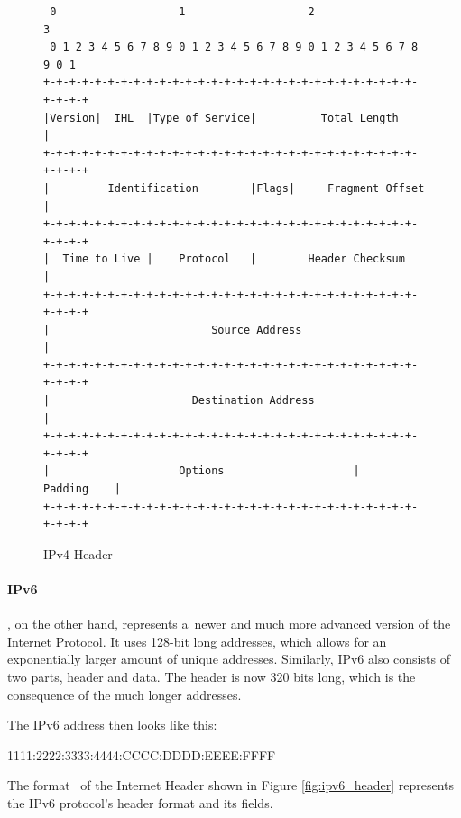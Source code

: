 \documentclass[
  printed,     %
  color,       %
  oneside,     %
  nosansbold,  %
  nocolorbold, %
  nolof,         %
  nolot,         %
]{fithesis4}
\begin{document}
\begin{figure}[h]
\fontsize{10pt}{10pt}\selectfont
\begin{center}
\begin{BVerbatim}
 0                   1                   2                   3  
 0 1 2 3 4 5 6 7 8 9 0 1 2 3 4 5 6 7 8 9 0 1 2 3 4 5 6 7 8 9 0 1
+-+-+-+-+-+-+-+-+-+-+-+-+-+-+-+-+-+-+-+-+-+-+-+-+-+-+-+-+-+-+-+-+
|Version|  IHL  |Type of Service|          Total Length         |
+-+-+-+-+-+-+-+-+-+-+-+-+-+-+-+-+-+-+-+-+-+-+-+-+-+-+-+-+-+-+-+-+
|         Identification        |Flags|     Fragment Offset     |
+-+-+-+-+-+-+-+-+-+-+-+-+-+-+-+-+-+-+-+-+-+-+-+-+-+-+-+-+-+-+-+-+
|  Time to Live |    Protocol   |        Header Checksum        |
+-+-+-+-+-+-+-+-+-+-+-+-+-+-+-+-+-+-+-+-+-+-+-+-+-+-+-+-+-+-+-+-+
|                         Source Address                        |
+-+-+-+-+-+-+-+-+-+-+-+-+-+-+-+-+-+-+-+-+-+-+-+-+-+-+-+-+-+-+-+-+
|                      Destination Address                      |
+-+-+-+-+-+-+-+-+-+-+-+-+-+-+-+-+-+-+-+-+-+-+-+-+-+-+-+-+-+-+-+-+
|                    Options                    |    Padding    |
+-+-+-+-+-+-+-+-+-+-+-+-+-+-+-+-+-+-+-+-+-+-+-+-+-+-+-+-+-+-+-+-+
\end{BVerbatim}
\end{center}
  \caption{IPv4 Header~\cite{RFC0791}}
  \label{fig:ip_header}
\end{figure}

 \paragraph{IPv6}, on the other hand, represents a~newer and much more advanced version of the Internet Protocol. It uses 128-bit long addresses, which allows for an exponentially larger amount of unique addresses. Similarly, IPv6 also consists of two parts, header and data. The header is now 320 bits long, which is the consequence of the much longer addresses.

 The IPv6 address then looks like this:

 \begin{center}
    1111:2222:3333:4444:CCCC:DDDD:EEEE:FFFF
\end{center}

The format~\cite{RFC2460} of the Internet Header shown in Figure \ref{fig:ipv6_header} represents the IPv6 protocol's header format and its fields.
\end{document}
